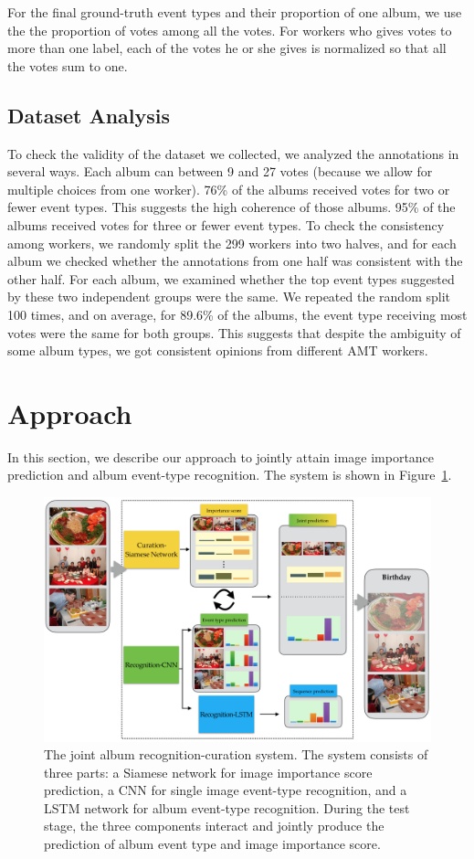 \documentclass[runningheads]{llncs}
\begin{document}
For the final ground-truth event types and their proportion of one album, we use the the proportion of votes among all the votes. For workers who gives votes to more than one label, each of the votes he or she gives is normalized so that all the votes sum to one.

\subsection{Dataset Analysis}
To check the validity of the dataset we collected, we analyzed the annotations in several ways. Each album can between 9 and 27 votes (because we allow for multiple choices from one worker). 76\% of the albums received votes for two or fewer event types. This suggests the high coherence of those albums. 95\% of the albums received votes for three or fewer event types.  To check the consistency among workers, we randomly split the 299 workers into two halves, and for each album we checked whether the annotations from one half was consistent with the other half. For each album, we examined whether the top event types suggested by these two independent groups were the same.
We repeated the random split 100 times, and on average, for 89.6\% of the albums, the event type receiving most votes were the same for both groups. This suggests that despite the ambiguity of some album types, we got consistent opinions from different AMT workers. 

\section{Approach}
\label{approach}
In this section, we describe our approach to jointly attain image importance prediction and album event-type recognition. The system is shown in Figure~\ref{figure1}. 

\begin{figure}
\centering
\includegraphics[width=4.8in]{architecture}
\caption{The joint album recognition-curation system. The system consists of three parts: a Siamese network for image importance score prediction, a CNN for single image event-type recognition, and a LSTM network for album event-type recognition. During the test stage, the three components interact and jointly produce the prediction of album event type and image importance score.}
\label{figure1}
\vspace{-0.3in}
\end{figure}
\end{document}
